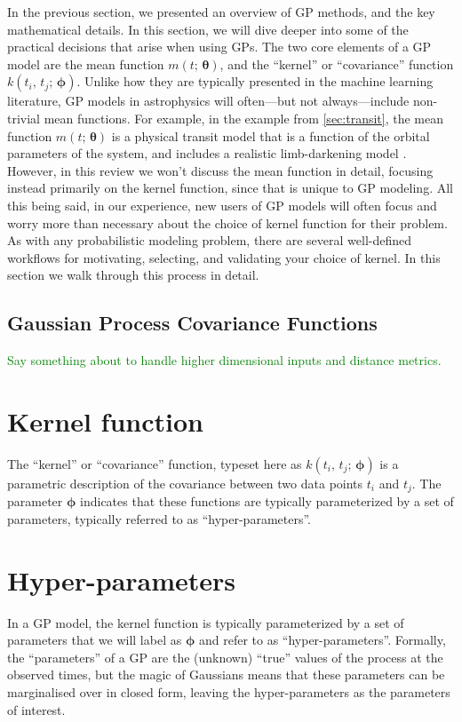 \documentclass[letterpaper]{ar-1col}
\newcommand{\dan}[1]{\textcolor{green}{#1}}
\newcommand{\hyperparams}{\ensuremath{\boldsymbol{\phi}}}
\newcommand{\meanparams}{\ensuremath{\boldsymbol{\theta}}}
\begin{document}
In the previous section, we presented an overview of GP methods, and the key mathematical details. In this section, we will dive deeper into some of the practical decisions that arise when using GPs.
The two core elements of a GP model are the mean function $m(t;\,\meanparams)$, and the ``kernel'' or ``covariance'' function $k(t_i,\,t_j;\,\hyperparams)$.
Unlike how they are typically presented in the machine learning literature, GP models in astrophysics will often---but not always---include non-trivial mean functions.
For example, in the example from \autoref{sec:transit}, the mean function $m(t;\,\meanparams)$ is a physical transit model that is a function of the orbital parameters of the system, and includes a realistic limb-darkening model \citep{2002ApJ...580L.171M}.
However, in this review we won't discuss the mean function in detail, focusing instead primarily on the kernel function, since that is unique to GP modeling.
All this being said, in our experience, new users of GP models will often focus and worry more than necessary about the choice of kernel function for their problem.
As with any probabilistic modeling problem, there are several well-defined workflows for motivating, selecting, and validating your choice of kernel.
In this section we walk through this process in detail.

\subsection{Gaussian Process Covariance Functions}
\label{sec:kernels}

\dan{Say something about to handle higher dimensional inputs and distance metrics.}

\begin{textbox}[htb]
  \section{Kernel function}
  The ``kernel'' or ``covariance'' function, typeset here as $k(t_i,\,t_j;\,\hyperparams)$ is a parametric description of the covariance between two data points $t_i$ and $t_j$. The parameter $\hyperparams$ indicates that these functions are typically parameterized by a set of parameters, typically referred to as ``hyper-parameters''.

  \vspace{1.5em}

  \section{Hyper-parameters}
  In a GP model, the kernel function is typically parameterized by a set of parameters that we will label as $\hyperparams$ and refer to as ``hyper-parameters''.
  Formally, the ``parameters'' of a GP are the (unknown) ``true'' values of the process at the observed times, but the magic of Gaussians means that these parameters can be marginalised over in closed form, leaving the hyper-parameters as the parameters of interest.
\end{textbox}
\end{document}
